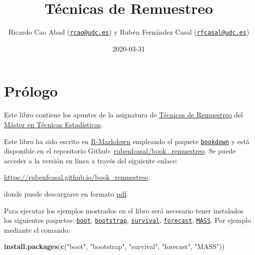 \documentclass[
]{book}
\title{Técnicas de Remuestreo}
\author{Ricardo Cao Abad (\href{mailto:rcao@udc.es}{\nolinkurl{rcao@udc.es}}) y Rubén Fernández Casal (\href{mailto:rfcasal@udc.es}{\nolinkurl{rfcasal@udc.es}})}
\date{2020-03-31}
\newenvironment{Shaded}{\begin{snugshade}}{\end{snugshade}}
\newcommand{\KeywordTok}[1]{\textcolor[rgb]{0.13,0.29,0.53}{\textbf{#1}}}
\newcommand{\NormalTok}[1]{#1}
\newcommand{\StringTok}[1]{\textcolor[rgb]{0.31,0.60,0.02}{#1}}
\theoremstyle{definition}
\theoremstyle{definition}
\theoremstyle{definition}
\theoremstyle{remark}
\begin{document}
\maketitle

{
\setcounter{tocdepth}{1}
\tableofcontents
}
\hypertarget{pruxf3logo}{%
\chapter*{Prólogo}\label{pruxf3logo}}

Este libro contiene los apuntes de la asignatura de \href{http://eamo.usc.es/pub/mte/index.php/es/?option=com_content\&view=article\&id=2202\&idm=22\&a\%C3\%B1o=2019}{Técnicas de Remuestreo} del \href{http://eio.usc.es/pub/mte}{Máster en Técnicas Estadísticas}.

Este libro ha sido escrito en \href{http://rmarkdown.rstudio.com}{R-Markdown} empleando el paquete \href{https://bookdown.org/yihui/bookdown/}{\texttt{bookdown}} y está disponible en el repositorio Github: \href{https://github.com/rubenfcasal/book_remuestreo}{rubenfcasal/book\_remuestreo}.
Se puede acceder a la versión en línea a través del siguiente enlace:

\url{https://rubenfcasal.github.io/book_remuestreo}.

donde puede descargarse en formato \href{https://rubenfcasal.github.io/book_remuestreo/book_remuestreo.pdf}{pdf}.

Para ejecutar los ejemplos mostrados en el libro será necesario tener instalados los siguientes paquetes:
\href{https://cran.r-project.org/web/packages/boot/index.html}{\texttt{boot}}, \href{https://cran.r-project.org/web/packages/bootstrap/index.html}{\texttt{bootstrap}}, \href{https://cran.r-project.org/web/packages/survival/index.html}{\texttt{survival}}, \href{https://cran.r-project.org/web/packages/forecast/index.html}{\texttt{forecast}}, \href{https://cran.r-project.org/web/packages/MASS/index.html}{\texttt{MASS}}.
Por ejemplo mediante el comando:

\begin{Shaded}
\begin{Highlighting}[]
\KeywordTok{install.packages}\NormalTok{(}\KeywordTok{c}\NormalTok{(}\StringTok{"boot"}\NormalTok{, }\StringTok{"bootstrap"}\NormalTok{, }\StringTok{"survival"}\NormalTok{, }\StringTok{"forecast"}\NormalTok{, }\StringTok{"MASS"}\NormalTok{))}
\end{Highlighting}
\end{Shaded}
\end{document}
